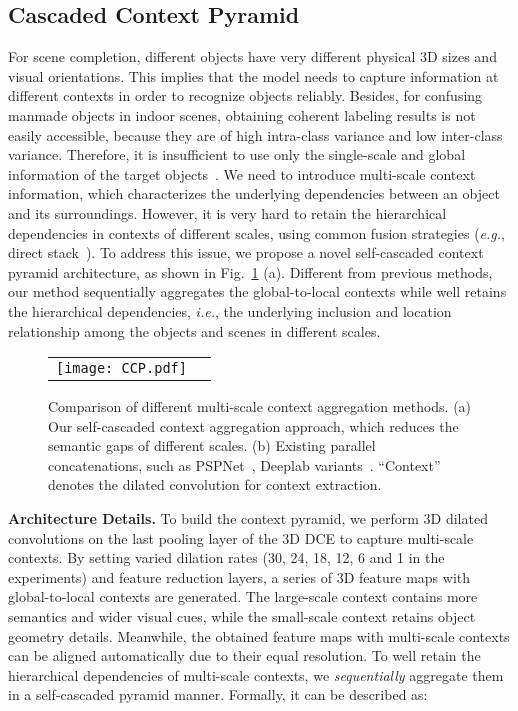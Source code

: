 \documentclass[10pt,twocolumn,letterpaper]{article}
\begin{document}
\subsection{Cascaded Context Pyramid}
For scene completion, different objects have very different physical 3D sizes and visual orientations.
This implies that the model needs to capture information at different contexts in order to recognize objects reliably.
Besides, for confusing manmade objects in indoor scenes, obtaining coherent labeling results is not easily accessible,
because they are of high intra-class variance and low inter-class variance.
Therefore, it is insufficient to use only the single-scale and global information of the target objects~\cite{song2017semantic,liu2018semantic}.
We need to introduce multi-scale context information, which characterizes the underlying dependencies between an
object and its surroundings.
However, it is very hard to retain the hierarchical dependencies in contexts of different scales, using common fusion strategies (\emph{e.g.}, direct stack~\cite{chen2018deeplab,zhao2017pyramid}).
To address this issue, we propose a novel self-cascaded context pyramid architecture, as shown in Fig.~\ref{fig:ccp} (a).
Different from previous methods, our method sequentially aggregates the global-to-local contexts while well retains the hierarchical dependencies, \emph{i.e.}, the underlying inclusion and location relationship among the objects and scenes in different scales.

\begin{figure}
\centering
\resizebox{0.5\textwidth}{!}
{
\begin{tabular}{@{}c@{}c@{}}
\texttt{[image: CCP.pdf]} \\
\end{tabular}
}
\caption{Comparison of different multi-scale context aggregation methods. (a) Our self-cascaded context aggregation approach, which reduces the semantic gaps of different scales. (b) Existing parallel concatenations, such as PSPNet~\cite{zhao2017pyramid}, Deeplab variants~\cite{chen2018deeplab}. ``Context'' denotes the dilated convolution for context extraction.}
\vspace{-2mm}
\label{fig:ccp}
\end{figure}
\textbf{Architecture Details.} To build the context pyramid, we perform 3D dilated convolutions on the last pooling layer of the 3D DCE to capture multi-scale contexts.
By setting varied dilation rates (30, 24, 18, 12, 6 and 1 in the experiments) and feature reduction layers, a series of
3D feature maps with global-to-local contexts are generated.
The large-scale context contains more semantics and wider visual cues, while the small-scale context retains object geometry details.
Meanwhile, the obtained feature maps with multi-scale contexts can be aligned automatically due to their equal resolution.
To well retain the hierarchical dependencies of multi-scale contexts, we \emph{sequentially} aggregate them in a self-cascaded pyramid manner.
Formally, it can be described as:
\end{document}
